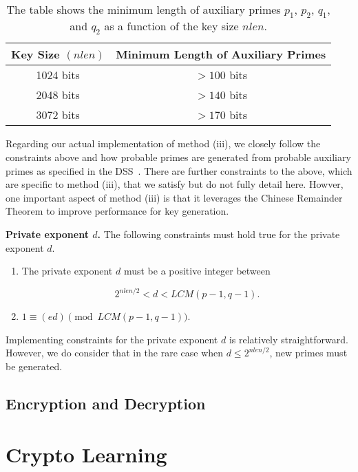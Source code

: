 \documentclass[a4paper]{article}
\begin{document}
\begin{table}[h]
\centering
\begin{tabular}{|c|c|} 
 \hline
 Key Size $(nlen)$ & Minimum Length of Auxiliary Primes\\ \hline
 1024 bits & $> 100$ bits \\ 
 2048 bits & $> 140$ bits \\ 
 3072 bits & $> 170$ bits \\
 \hline
\end{tabular}
\caption{The table shows the minimum length of auxiliary primes $p_1$, $p_2$, $q_1$, and $q_2$ as a function of the key size $nlen$.}
\label{tab:aux_len}
\end{table}

Regarding our actual implementation of method (iii), we closely follow the constraints above and how probable primes are generated from probable auxiliary primes as specified in the DSS~\cite{fips2013186}. There are further constraints to the above, which are specific to method (iii), that we satisfy but do not fully detail here. Howver, one important aspect of method (iii) is that it leverages the Chinese Remainder Theorem to improve performance for key generation.\newline

\noindent \textbf{Private exponent $d$.} The following constraints must hold true for the private exponent $d$.

\begin{enumerate}
    \item The private exponent $d$ must be a positive integer between

        \begin{equation}
            2^{nlen/2} < d < LCM(p-1,q-1).
        \end{equation}

    \item $1 \equiv (ed) \pmod{LCM(p-1,q-1)}$.
\end{enumerate}

Implementing constraints for the private exponent $d$ is relatively straightforward. However, we do consider that in the rare case when $d \leq 2^{nlen/2}$, new primes must be generated.

\subsection{Encryption and Decryption}

\section{Crypto Learning}
\end{document}
